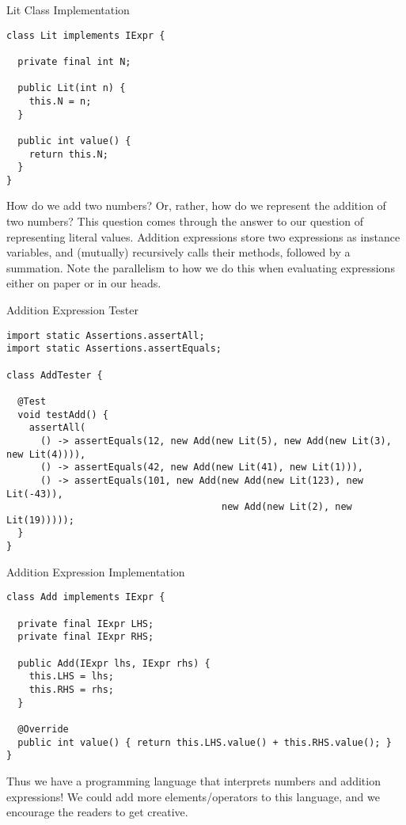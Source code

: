 \begin{cl}[]{Lit Class Implementation}
\begin{lstlisting}[language=MyJava]
class Lit implements IExpr {

  private final int N;

  public Lit(int n) { 
    this.N = n; 
  }

  public int value() { 
    return this.N; 
  }
}
\end{lstlisting}
\end{cl}

How do we add two numbers? Or, rather, how do we represent the addition of two numbers? This question comes through the answer to our question of representing literal values. Addition expressions store two  expressions as instance variables, and (mutually) recursively calls their  methods, followed by a summation. Note the parallelism to how we do this when evaluating expressions either on paper or in our heads.

\begin{cl}[]{Addition Expression Tester}
\begin{lstlisting}[language=MyJava]
import static Assertions.assertAll;
import static Assertions.assertEquals;

class AddTester {

  @Test
  void testAdd() {
    assertAll(
      () -> assertEquals(12, new Add(new Lit(5), new Add(new Lit(3), new Lit(4)))),
      () -> assertEquals(42, new Add(new Lit(41), new Lit(1))),
      () -> assertEquals(101, new Add(new Add(new Lit(123), new Lit(-43)),
                                      new Add(new Lit(2), new Lit(19)))));
  }
}
\end{lstlisting}
\end{cl}

\begin{cl}[]{Addition Expression Implementation}
\begin{lstlisting}[language=MyJava]
class Add implements IExpr {

  private final IExpr LHS;
  private final IExpr RHS;

  public Add(IExpr lhs, IExpr rhs) {
    this.LHS = lhs;
    this.RHS = rhs;
  }

  @Override
  public int value() { return this.LHS.value() + this.RHS.value(); }
}
\end{lstlisting}
\end{cl}

Thus we have a programming language that interprets numbers and addition expressions! We could add more elements/operators to this language, and we encourage the readers to get creative.
  
